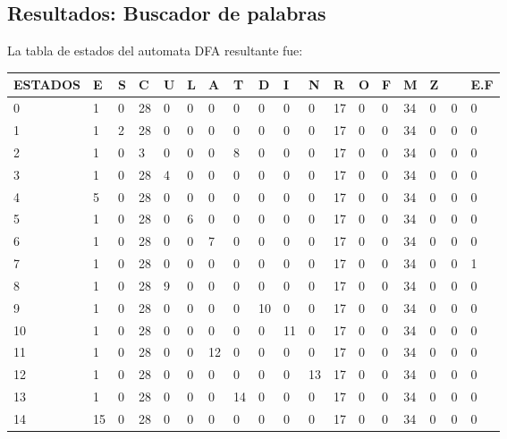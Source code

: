 \documentclass{article}
\begin{document}
    \subsection{Resultados: Buscador de palabras}
    La tabla de estados del automata DFA resultante fue:
    \begin{table}[!htbp]
        \centering
        \begin{adjustbox}{max width=\textwidth}
        \begin{tabular}{|l|l|l|l|l|l|l|l|l|l|l|l|l|l|l|l|l|l|}
        \hline
            ESTADOS & E & S & C & U & L & A & T & D & I & N & R & O & F & M & Z & ~ & E.F \\ \hline
            0 & 1 & 0 & 28 & 0 & 0 & 0 & 0 & 0 & 0 & 0 & 17 & 0 & 0 & 34 & 0 & 0 & 0 \\ \hline
            1 & 1 & 2 & 28 & 0 & 0 & 0 & 0 & 0 & 0 & 0 & 17 & 0 & 0 & 34 & 0 & 0 & 0 \\ \hline
            2 & 1 & 0 & 3 & 0 & 0 & 0 & 8 & 0 & 0 & 0 & 17 & 0 & 0 & 34 & 0 & 0 & 0 \\ \hline
            3 & 1 & 0 & 28 & 4 & 0 & 0 & 0 & 0 & 0 & 0 & 17 & 0 & 0 & 34 & 0 & 0 & 0 \\ \hline
            4 & 5 & 0 & 28 & 0 & 0 & 0 & 0 & 0 & 0 & 0 & 17 & 0 & 0 & 34 & 0 & 0 & 0 \\ \hline
            5 & 1 & 0 & 28 & 0 & 6 & 0 & 0 & 0 & 0 & 0 & 17 & 0 & 0 & 34 & 0 & 0 & 0 \\ \hline
            6 & 1 & 0 & 28 & 0 & 0 & 7 & 0 & 0 & 0 & 0 & 17 & 0 & 0 & 34 & 0 & 0 & 0 \\ \hline
            7 & 1 & 0 & 28 & 0 & 0 & 0 & 0 & 0 & 0 & 0 & 17 & 0 & 0 & 34 & 0 & 0 & 1 \\ \hline
            8 & 1 & 0 & 28 & 9 & 0 & 0 & 0 & 0 & 0 & 0 & 17 & 0 & 0 & 34 & 0 & 0 & 0 \\ \hline
            9 & 1 & 0 & 28 & 0 & 0 & 0 & 0 & 10 & 0 & 0 & 17 & 0 & 0 & 34 & 0 & 0 & 0 \\ \hline
            10 & 1 & 0 & 28 & 0 & 0 & 0 & 0 & 0 & 11 & 0 & 17 & 0 & 0 & 34 & 0 & 0 & 0 \\ \hline
            11 & 1 & 0 & 28 & 0 & 0 & 12 & 0 & 0 & 0 & 0 & 17 & 0 & 0 & 34 & 0 & 0 & 0 \\ \hline
            12 & 1 & 0 & 28 & 0 & 0 & 0 & 0 & 0 & 0 & 13 & 17 & 0 & 0 & 34 & 0 & 0 & 0 \\ \hline
            13 & 1 & 0 & 28 & 0 & 0 & 0 & 14 & 0 & 0 & 0 & 17 & 0 & 0 & 34 & 0 & 0 & 0 \\ \hline
            14 & 15 & 0 & 28 & 0 & 0 & 0 & 0 & 0 & 0 & 0 & 17 & 0 & 0 & 34 & 0 & 0 & 0 \\ \hline

\end{tabular}
\end{adjustbox}
\end{table}
\end{document}
